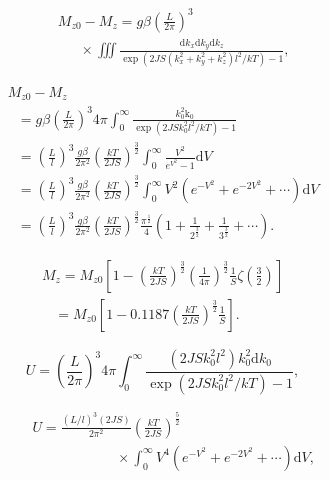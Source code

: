 \documentclass{article}
\begin{document}
\begin{eqnarray} \label{eq:26}
&&M_{z0}-M_{z}=g\beta\left(\frac{L}{2\pi}\right)^3\nonumber\\
&&\phantom{~~~~~~~}\times\iiint\frac{\mathrm{d}k_x\mathrm{d}k_y\mathrm{d}k_z}{\exp(2JS(k_x^2+k_y^2+k_z^2)l^2/kT)-1},
\end{eqnarray}

\begin{equation} \label{eq:27}
\begin{array}{l}
M_{z0}-M_z\\
\phantom{~~~}=g\beta\displaystyle\left(\frac{L}{2\pi}\right)^3 4\pi\int_0^\infty\frac{k_0^2\mathrm{k_0}}{\exp(2JSk_0^2l^2/kT)-1}\\
\phantom{~~~}=\displaystyle\left(\frac{L}{l}\right)^3\frac{g\beta}{2\pi^2}\left(\frac{kT}{2JS}\right)^{\frac{3}{2}}\int_0^\infty\frac{V^2}{e^{V^2}-1}\mathrm{d}V\\
\phantom{~~~}=\displaystyle\left(\frac{L}{l}\right)^3\frac{g\beta}{2\pi^2}\left(\frac{kT}{2JS}\right)^{\frac{3}{2}}\int_0^\infty V^2(e^{-V^2}+e^{-2V^2}+\cdots)\mathrm{d}V\\
\phantom{~~~}=\displaystyle\left(\frac{L}{l}\right)^3\frac{g\beta}{2\pi^2}\left(\frac{kT}{2JS}\right)^{\frac{3}{2}}\frac{\pi^{\frac{1}{2}}}{4}\left(1+\frac{1}{2^{\frac{3}{2}}}+\frac{1}{3^{\frac{3}{2}}}+\cdots\right).
\end{array}
\end{equation}

\begin{equation} \label{eq:28}
\begin{array}{l}
M_z=M_{z0}\displaystyle\left[1-\left(\frac{kT}{2JS}\right)^{\frac{3}{2}}\left(\frac{1}{4\pi}\right)^{\frac{3}{2}}\frac{1}{S}\zeta(\frac{3}{2})\right]\\
\phantom{~~~~}=\displaystyle M_{z0}\left[1-0.1187\left(\frac{kT}{2JS}\right)^{\frac{3}{2}}\frac{1}{S}\right].
\end{array}
\end{equation}

\begin{equation} \label{eq:29}
U=\left(\frac{L}{2\pi}\right)^3 4\pi\int_0^\infty\frac{(2JSk_0^2l^2)k_0^2\mathrm{d}k_0}{\exp(2JSk_0^2l^2/kT)-1},
\end{equation}

\begin{eqnarray} \label{eq:30}
&&U=\frac{(L/l)^3(2JS)}{2\pi^2}\left(\frac{kT}{2JS}\right)^{\frac{5}{2}}\nonumber\\
&&\phantom{~~~~~~~~~~~~~~~~~~~~~~~~~~~}\times\int_0^\infty V^4(e^{-V^2}+e^{-2V^2}+\cdots)\mathrm{d}V,
\end{eqnarray}
\end{document}
